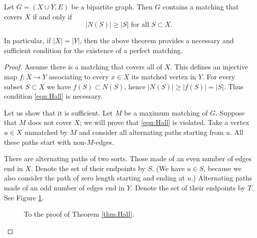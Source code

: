 \begin{page}
\setcounter{section}{4}
\setcounter{subsection}{4}
\setcounter{dfn}{7}
\label{portion:342}

\begin{thm}[Hall]
\label{thm:Hall}
Let $G = (X \cup Y, E)$ be a bipartite graph.
Then $G$ contains a matching that covers $X$ if and only if
\begin{equation}
\label{eqn:Hall}
|N(S)| \ge |S| \text{ for all } S \subset X.
\end{equation}
\end{thm}

\end{page}

\begin{page}
\setcounter{section}{4}
\setcounter{subsection}{4}
\setcounter{dfn}{7}
\label{portion:343}

In particular, if $|X| = |Y|$, then the above theorem provides a necessary and sufficient condition for the existence of a perfect matching.
\begin{proof}
Assume there is a matching that covers all of $X$.
This defines an injective map $f \colon X \to Y$ associating to every $x \in X$ its matched vertex in $Y$.
For every subset $S \subset X$ we have $f(S) \subset N(S)$, hence $|N(S)| \ge |f(S)| = |S|$.
Thus condition \eqref{eqn:Hall} is necessary.

Let us show that it is sufficient.
Let $M$ be a maximum matching of $G$.
Suppose that $M$ does not cover $X$; we will prove that \eqref{eqn:Hall} is violated.
Take a vertex $u \in X$ unmatched by $M$ and consider all alternating paths starting from $u$.
All these paths start with non-$M$-edges.

There are alternating paths of two sorts.
Those made of an even number of edges end in $X$.
Denote the set of their endpoints by $S$.
(We have $u \in S$, because we also consider the path of zero length starting and ending at $u$.)
Alternating paths made of an odd number of edges end in $Y$.
Denote the set of their endpoints by $T$.
See Figure \ref{fig:HallProof}.

\begin{figure}[ht]
\begin{center}

\end{center}
\caption{To the proof of Theorem \ref{thm:Hall}.}
\label{fig:HallProof}
\end{figure}


\end{proof}
\end{page}
